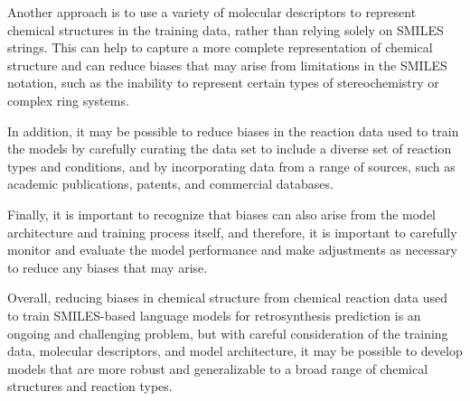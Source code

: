 Another approach is to use a variety of molecular descriptors to represent chemical structures in the training data, rather than relying solely on SMILES strings. This can help to capture a more complete representation of chemical structure and can reduce biases that may arise from limitations in the SMILES notation, such as the inability to represent certain types of stereochemistry or complex ring systems.

In addition, it may be possible to reduce biases in the reaction data used to train the models by carefully curating the data set to include a diverse set of reaction types and conditions, and by incorporating data from a range of sources, such as academic publications, patents, and commercial databases.

Finally, it is important to recognize that biases can also arise from the model architecture and training process itself, and therefore, it is important to carefully monitor and evaluate the model performance and make adjustments as necessary to reduce any biases that may arise.

Overall, reducing biases in chemical structure from chemical reaction data used to train SMILES-based language models for retrosynthesis prediction is an ongoing and challenging problem, but with careful consideration of the training data, molecular descriptors, and model architecture, it may be possible to develop models that are more robust and generalizable to a broad range of chemical structures and reaction types.



